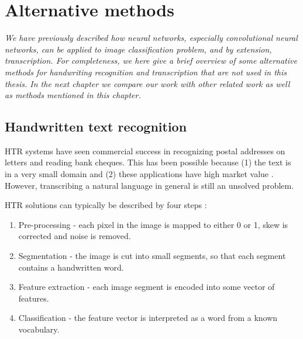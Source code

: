 
\chapter{Alternative methods}
\textit{ We have previously described how neural networks, especially convolutional neural networks, can be applied to image classification problem, and by extension, transcription.
For completeness, we here give a brief overview of some alternative methods for handwriting recognition and transcription that are not used in this thesis.
In the next chapter we compare our work with other related work as well as methods mentioned in this chapter.
}



\section{Handwritten text recognition} \label{sec:alt_htr}

HTR systems have
seen commercial success in
recognizing postal addresses on letters \cite{lecun_1989, zipcode_system} and reading bank cheques. This has been possible because (1) the text is in a very small domain and (2) these applications have high market value \cite{40_years_HWR}. However, transcribing a natural language in general is still an unsolved problem.

HTR solutions can typically be described by four steps \cite{offline_HWR_CNN}:
\begin{enumerate}
    \item Pre-processing - each pixel in the image is mapped to either 0 or 1, skew is corrected and noise is removed.
    \item Segmentation - the image is cut into small segments, so that each segment contains a handwritten word.
    \item Feature extraction - each image segment is encoded into some vector of features.
    \item Classification - the feature vector is interpreted as a word from a known vocabulary.
\end{enumerate}

